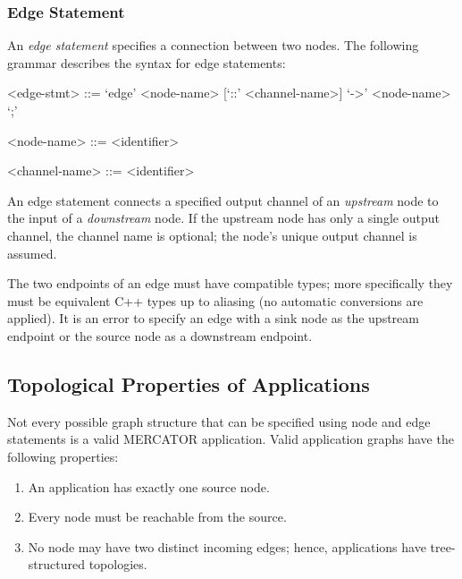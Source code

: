 \documentclass[11pt]{article}
\begin{document}
\subsubsection{Edge Statement}

An \emph{edge statement} specifies a connection between two nodes.
The following grammar describes the syntax for edge statements:
\begin{grammar}

<edge-stmt> ::= `edge' <node-name> [`::' <channel-name>] `->' <node-name> `;'

<node-name> ::= <identifier>

<channel-name> ::= <identifier>

\end{grammar}

An edge statement connects a specified output channel of an
\emph{upstream} node to the input of a \emph{downstream} node. If
the upstream node has only a single output channel, the channel
name is optional; the node's unique output channel is assumed.

The two endpoints of an edge must have compatible types; more
specifically they must be equivalent C++ types up to aliasing (no
automatic conversions are applied).  It is an error to specify an edge
with a sink node as the upstream endpoint or the source node as a
downstream endpoint.

\subsection{Topological Properties of Applications}

Not every possible graph structure that can be specified using node
and edge statements is a valid MERCATOR application. Valid application
graphs have the following properties:

\begin{enumerate}

\item An application has exactly one source node.

\item Every node must be reachable from the source.

\item No node may have two distinct incoming edges; hence,
  applications have tree-structured topologies.




\end{enumerate}
\end{document}

